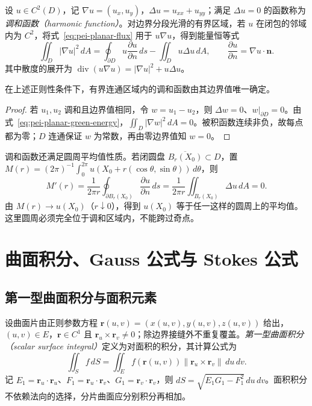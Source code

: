 设 $u\in C^2(D)$，记 $\nabla u=(u_x,u_y)$，$\Delta u=u_{xx}+u_{yy}$；满足 $\Delta u=0$ 的函数称为\emph{调和函数（harmonic function）}。对边界分段光滑的有界区域，若 $u$ 在闭包的邻域内为 $C^2$，将式~\eqref{eq:pei-planar-flux} 用于 $u\nabla u$，得到能量恒等式
\begin{equation}
\label{eq:pei-planar-green-energy}
\iint_D|\nabla u|^2\,dA
=\oint_{\partial D}u\frac{\partial u}{\partial n}\,ds
-\iint_Du\Delta u\,dA,
\qquad \frac{\partial u}{\partial n}=\nabla u\cdot\boldsymbol n.
\end{equation}
其中散度的展开为 $\operatorname{div}(u\nabla u)=|\nabla u|^2+u\Delta u$。

\begin{proposition}
\label{prop:pei-harmonic-uniqueness}
在上述正则性条件下，有界连通区域内的调和函数由其边界值唯一确定。
\end{proposition}
\begin{proof}
若 $u_1,u_2$ 调和且边界值相同，令 $w=u_1-u_2$，则 $\Delta w=0$、$w|_{\partial D}=0$。由式~\eqref{eq:pei-planar-green-energy}，$\iint_D|\nabla w|^2\,dA=0$。被积函数连续非负，故每点都为零；$D$ 连通保证 $w$ 为常数，再由零边界值知 $w=0$。
\end{proof}

调和函数还满足圆周平均值性质。若闭圆盘 $\overline{B_r(X_0)}\subset D$，置
$M(r)=(2\pi)^{-1}\int_0^{2\pi}u(X_0+r(\cos\theta,\sin\theta))\,d\theta$，则
\[
M'(r)=\frac1{2\pi r}\oint_{\partial B_r(X_0)}\frac{\partial u}{\partial n}\,ds
=\frac1{2\pi r}\iint_{B_r(X_0)}\Delta u\,dA=0.
\]
由 $M(r)\to u(X_0)$（$r\downarrow0$），得到 $u(X_0)$ 等于任一这样的圆周上的平均值。这里圆周必须完全位于调和区域内，不能跨过奇点。

\section{曲面积分、Gauss 公式与 Stokes 公式}
\label{sec:pei-surface-gauss-stokes}

\subsection{第一型曲面积分与面积元素}

设曲面片由正则参数方程 $\boldsymbol r(u,v)=(x(u,v),y(u,v),z(u,v))$ 给出，$(u,v)\in E$，$\boldsymbol r\in C^1$ 且 $\boldsymbol r_u\times\boldsymbol r_v\ne0$；除边界接缝外不重复覆盖。\emph{第一型曲面积分（scalar surface integral）}定义为对面积的积分，其计算公式为
\begin{equation}
\label{eq:pei-scalar-surface}
\iint_Sf\,dS
=\iint_E f(\boldsymbol r(u,v))\|\boldsymbol r_u\times\boldsymbol r_v\|\,du\,dv.
\end{equation}
记 $E_1=\boldsymbol r_u\cdot\boldsymbol r_u$、$F_1=\boldsymbol r_u\cdot\boldsymbol r_v$、$G_1=\boldsymbol r_v\cdot\boldsymbol r_v$，则 $dS=\sqrt{E_1G_1-F_1^2}\,du\,dv$。面积积分不依赖法向的选择，分片曲面应分别积分再相加。

